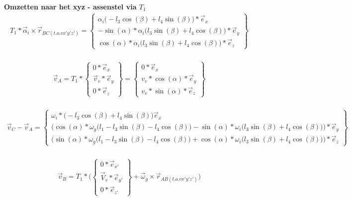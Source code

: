\documentclass[a4paper,10pt]{article}
\begin{document}
\textbf{Omzetten naar het xyz - assenstel via $T_1$}
\begin{equation}
	\begin{aligned}
		{T}_{1}*\vec{\alpha}_i \times \vec{r}_{BC(t.o.v x'y'z')} = \begin{Bmatrix}
			{\alpha_i \Big(- l_3 \cos(\beta) + l_4 \sin(\beta)\Big)*\vec{e}_{x}}\\
			-\sin(\alpha)*	\alpha_i \Big(l_3 \sin(\beta) + l_4 \cos(\beta)\Big)*\vec{e}_{y}\\
			\cos(\alpha)*\alpha_i \Big(l_3 \sin(\beta) + l_4 \cos(\beta)\Big)*\vec{e}_{z}
		\end{Bmatrix}
	\end{aligned}
\end{equation}\\
\begin{equation}
	\begin{aligned}
		\vec{v}_A = {T}_{1}* \begin{Bmatrix}
			{0*\vec{e}_{x}}\\
			\vec{v}_v*\vec{e}_{y}\\
			0*\vec{e}_{z}
		\end{Bmatrix} = \begin{Bmatrix}
		{0*\vec{e}_{x}}\\
		v_v*\cos(\alpha)*\vec{e}_{y}\\
		v_v*\sin(\alpha)*\vec{e}_{z}
	\end{Bmatrix}
\end{aligned}
\end{equation}\\
\begin{equation}
	\begin{aligned}
		\vec{v}_C -\vec{v}_A = \begin{Bmatrix}
			{\omega_i*\Big( - l_3 \cos(\beta) + l_4 \sin(\beta)\Big)\vec{e}_{x}}\\
			\Big(\cos(\alpha)*\omega_g \Big(l_1 - l_3 \sin(\beta) - l_4 \cos(\beta)\Big) -\sin(\alpha)*	\omega_i \Big(l_3 \sin(\beta) + l_4 \cos(\beta)\Big)\Big)*\vec{e}_{y}\\
			\Big(\sin(\alpha)*\omega_g \Big(l_1 - l_3 \sin(\beta) - l_4 \cos(\beta)\Big) +\cos(\alpha)*	\omega_i \Big(l_3 \sin(\beta) + l_4 \cos(\beta)\Big)\Big)*\vec{e}_{z}
		\end{Bmatrix} 
	\end{aligned}
\end{equation}\\
\begin{equation}
	\begin{aligned}
		\vec{v}_B = {T}_{1}* \Big(\begin{Bmatrix}
			{0*\vec{e}_{x'}}\\
			\vec{V}_v*\vec{e}_{y'}\\
			0*\vec{e}_{z'} 
		\end{Bmatrix} + \vec{\omega}_g \times \vec{r}_{AB(t.o.v x'y'z')}\Big)
	\end{aligned}
\end{equation}\\
\end{document}
